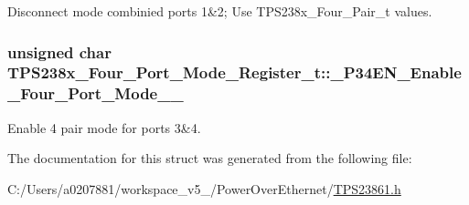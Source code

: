 Disconnect mode combinied ports 1\&2; Use T\-P\-S238x\-\_\-\-Four\-\_\-\-Pair\-\_\-t values. 

\hypertarget{struct_t_p_s238x___four___port___mode___register__t_a5f079d9ebd2b348e3d8ba863ebcf0f26}{
\subsubsection[{\-\_\-4\-P34\-E\-N\-\_\-\-Enable\-\_\-\-Four\-\_\-\-Port\-\_\-\-Mode\-\_\-3\-\_\-4}]{\setlength{\rightskip}{0pt plus 5cm}unsigned char T\-P\-S238x\-\_\-\-Four\-\_\-\-Port\-\_\-\-Mode\-\_\-\-Register\-\_\-t\-::\-\_\-P34\-E\-N\-\_\-\-Enable\-\_\-\-Four\-\_\-\-Port\-\_\-\-Mode\-\_\-\_}}\label{struct_t_p_s238x___four___port___mode___register__t_a5f079d9ebd2b348e3d8ba863ebcf0f26}


Enable 4 pair mode for ports 3\&4. 



The documentation for this struct was generated from the following file\-:\begin{DoxyCompactItemize}
\item 
C\-:/\-Users/a0207881/workspace\-\_\-v5\-\_/\-Power\-Over\-Ethernet/\hyperlink{_t_p_s23861_8h}{T\-P\-S23861.\-h}\end{DoxyCompactItemize}
